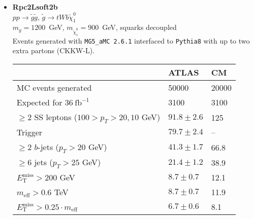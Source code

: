 \documentclass[10pt,fleqn]{article}
\newcommand{\met}{E^\mathrm{miss}_\mathrm{T}}
\newcommand{\meff}{m_\mathrm{eff}}
\begin{document}
\begin{itemize}
\item \textbf{Rpc2Lsoft2b}\\ $ p p \to \tilde{g} \tilde{g} $, $\tilde{g} \to t W b \tilde{\chi}_1^0$\\
 $m_{g} = 1200$~GeV, $m_{\tilde{\chi}_1^0} = 900$~GeV, squarks decoupled\\
 Events generated with \texttt{MG5\_aMC 2.6.1} interfaced to \texttt{Pythia8} with up to two extra partons (CKKW-L).
 \begin{tabular}{l|p{3cm}|p{3cm}} \toprule
                                           &  ATLAS           & CM  \\ \midrule
 MC events generated                       &  50000           & 20000 \\ \midrule
 Expected for $36\ \mathrm{fb}^{-1}$       &  3100            & 3100  \\
 $\geq 2$ SS leptons ($100>p_T > 20, 10$ GeV)& $91.8\pm 2.6$  &  125\\
 Trigger                                   & $79.7\pm 2.4$    &  --\\
 $\geq 2$ $b$-jets ($p_T > 20$ GeV)        & $41.3\pm 1.7$    &  66.8\\
 $\geq 6$ jets ($p_T > 25$ GeV)            & $21.4\pm 1.2$    &  38.9\\
 $\met  > 200$ GeV                         & $8.7\pm 0.7$    &  12.1\\
 $\meff  > 0.6$ TeV                         & $8.7\pm 0.7$   &  11.9\\ 
 $\met > 0.25 \cdot \meff$                  & $6.7 \pm 0.6$   &  8.1\\   \bottomrule
 \end{tabular}  
 

\end{itemize}
\end{document}

